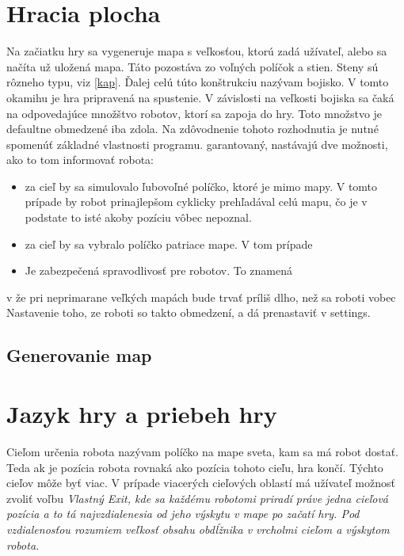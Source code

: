 \section{Hracia plocha} %
Na začiatku hry sa vygeneruje mapa s veľkosťou, ktorú zadá užívateľ, alebo sa načíta už uložená mapa. Táto pozostáva zo voľných políčok a stien. Steny sú rôzneho typu, viz \ref{kap}. Ďalej celú túto konštrukciu nazývam bojisko. V tomto okamihu je hra pripravená na spustenie. V závislosti na veľkosti bojiska sa čaká na odpovedajúce množštvo robotov, ktorí sa zapoja do hry. Toto množstvo je defaultne obmedzené iba zdola. Na zdôvodnenie tohoto rozhodnutia je nutné spomenúť základné vlastnosti programu. 
garantovaný, nastávajú dve možnosti, ako to tom informovať robota:
\begin{itemize}
\item za cieľ by sa simulovalo ľubovoľné políčko, ktoré je mimo mapy. V tomto prípade by robot prinajlepšom cyklicky prehľadával celú mapu, čo je v podstate to isté akoby pozíciu vôbec nepoznal.
\item za cieľ by sa vybralo políčko patriace mape. V tom prípade 
\item Je zabezpečená spravodlivosť pre robotov. To znamená
\end{itemize}

v  že pri neprimarane veľkých mapách bude trvať príliš dlho, než sa roboti vobec  
Nastavenie toho, ze roboti so takto obmedzení, a dá prenastaviť v settings.%
\subsection{Generovanie map}%
\section{Jazyk hry a priebeh hry} %
\begin{definicia}
Cieľom určenia robota nazývam políčko na mape sveta, kam sa má robot dostať. Teda ak je pozícia robota rovnaká ako pozícia tohoto cieľu, hra končí. Týchto cieľov môže byť viac. V prípade viacerých cieľových oblastí má užívateľ možnosť zvoliť voľbu \it{Vlastný Exit}, kde sa každému robotomi priradí práve jedna cieľová pozícia a to tá najvzdialenesia od jeho výskytu v mape po začatí hry.
Pod vzdialenosťou rozumiem veľkosť obsahu obdĺžnika v vrcholmi cieľom a výskytom robota. %
\end{definicia}

